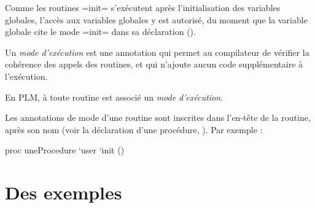 Comme les routines \plm=init= s'exécutent après l'initialisation des variables globales, l'accès aux variables globales y est autorisé, du moment que la variable globale cite le mode \plm=init= dans sa déclaration ().































































Un \emph{mode d'exécution} est une annotation qui permet au compilateur de vérifier la cohérence des appels des routines, et qui n'ajoute aucun code supplémentaire à l'exécution.

En PLM, à toute routine est associé un \emph{mode d'exécution}.

Les annotations de mode d'une routine sont inscrites dans l'en-tête de la routine, après son nom (voir la déclaration d'une procédure, ). Par exemple :

\begin{PLM}
proc uneProcedure `user `init () {
}
\end{PLM}


\section{Des exemples}

